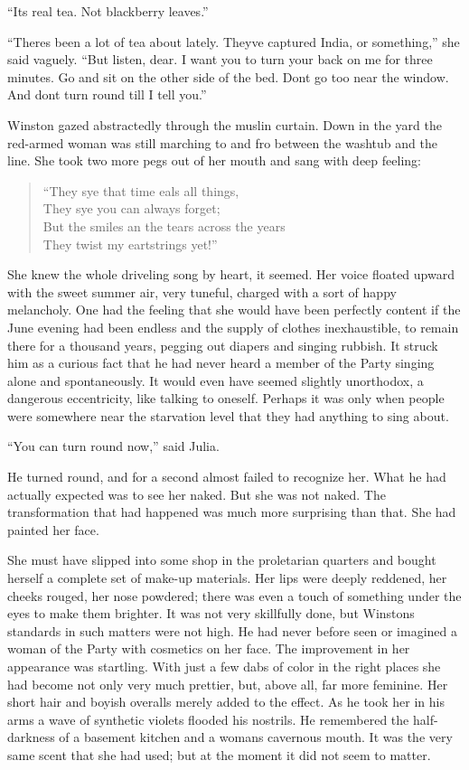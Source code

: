 ``It\textquotesingle s real tea. Not blackberry leaves.''

``There\textquotesingle s been a lot of tea about lately.
They\textquotesingle ve captured India, or something,'' she said vaguely.
``But listen, dear. I want you to turn your back on me for three minutes.
Go and sit on the other side of the bed. Don\textquotesingle t go too
near the window. And don\textquotesingle t turn round till I tell you.''

Winston gazed abstractedly through the muslin curtain. Down in the yard
the red-armed woman was still marching to and fro between the washtub
and the line. She took two more pegs out of her mouth and sang with deep
feeling:

\begin{quotation}
 \noindent ``They sye that time \textquotesingle eals all things,\\
  They sye you can always forget;\\
  But the smiles an the tears across the years\\
  They twist my \textquotesingle eartstrings yet!''
\end{quotation}

She knew the whole driveling song by heart, it seemed. Her voice floated
upward with the sweet summer air, very tuneful, charged with a sort of
happy melancholy. One had the feeling that she would have been perfectly
content if the June evening had been endless and the supply of clothes
inexhaustible, to remain there for a thousand years, pegging out diapers
and singing rubbish. It struck him as a curious fact that he had never
heard a member of the Party singing alone and spontaneously. It would
even have seemed slightly unorthodox, a dangerous eccentricity, like
talking to oneself. Perhaps it was only when people were somewhere near
the starvation level that they had anything to sing about.

``You can turn round now,'' said Julia.

He turned round, and for a second almost failed to recognize her. What
he had actually expected was to see her naked. But she was not naked.
The transformation that had happened was much more surprising than that.
She had painted her face.

She must have slipped into some shop in the proletarian quarters and
bought herself a complete set of make-up materials. Her lips were deeply
reddened, her cheeks rouged, her nose powdered; there was even a touch
of something under the eyes to make them brighter. It was not very
skillfully done, but Winston\textquotesingle s standards in such matters
were not high. He had never before seen or imagined a woman of the Party
with cosmetics on her face. The improvement in her appearance was
startling. With just a few dabs of color in the right places she had
become not only very much prettier, but, above all, far more feminine.
Her short hair and boyish overalls merely added to the effect. As he
took her in his arms a wave of synthetic violets flooded his nostrils.
He remembered the half-darkness of a basement kitchen and a
woman\textquotesingle s cavernous mouth. It was the very same scent that
she had used; but at the moment it did not seem to matter.

